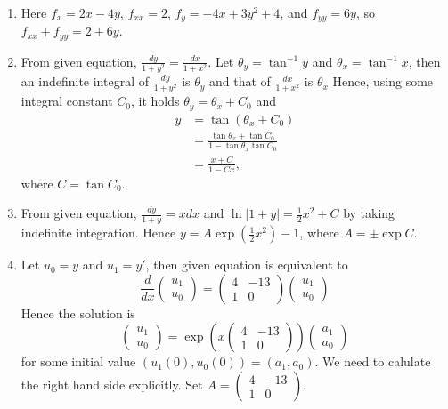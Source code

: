 \documentclass{article}
\begin{document}
\begin{enumerate}
  \item 
    Here $f_x = 2x - 4y$, $f_{xx} = 2$, $f_y = -4x + 3y^2 + 4$, and $f_{yy} = 6y$, so
    $f_{xx} + f_{yy} = 2 + 6y$.
  
  \item
    From given equation, $\frac{dy}{1+y^2} = \frac{dx}{1+x^2}$.
    Let $\theta_y = \tan^{-1} y$ and $\theta_x = \tan^{-1} x$,
    then an indefinite integral of $\frac{dy}{1+y^2}$ is $\theta_y$ and
    that of $\frac{dx}{1+x^2}$ is $\theta_x$
    Hence, using some integral constant $C_0$, it holds
    $\theta_y = \theta_x + C_0$ and
    \begin{align*}
      y &= \tan(\theta_x + C_0) \\
        &= \frac{\tan \theta_x + \tan C_0}
          {1 - \tan{\theta_x} \tan{C_0}} \\
        &= \frac{x + C}{1 - Cx},
    \end{align*}
    where $C = \tan C_0$.

  \item 
    From given equation, $\frac{dy}{1+y} = x dx$ and $\ln |1+y| = \frac{1}{2} x^2 + C$ by taking indefinite integration.
    Hence $y = A \exp \left( \frac{1}{2} x^2 \right) - 1$, where $A = \pm \exp C$.
  
  \item 
    Let $u_0 = y $ and $u_1 = y'$, then given equation is equivalent to
    $$
      \frac{d}{dx}
      \begin{pmatrix}
        u_1 \\
        u_0
      \end{pmatrix}
      =
      \begin{pmatrix}
        4 & -13 \\
        1 & 0
      \end{pmatrix}
      \begin{pmatrix}
        u_1 \\
        u_0
      \end{pmatrix}
    $$
    Hence the solution is 
    $$
      \begin{pmatrix}
        u_1 \\
        u_0
      \end{pmatrix}
      =
      \exp \left(
        x
        \begin{pmatrix}
          4 & -13 \\
          1 & 0
        \end{pmatrix}
      \right)
      \begin{pmatrix}
        a_1 \\
        a_0
      \end{pmatrix}
    $$
    for some initial value $(u_1(0), u_0(0)) = (a_1, a_0)$.
    We need to calulate the right hand side explicitly.
    Set $A = \begin{pmatrix}
      4 & -13 \\
      1 & 0
    \end{pmatrix}
    $. 


\end{enumerate}
\end{document}
